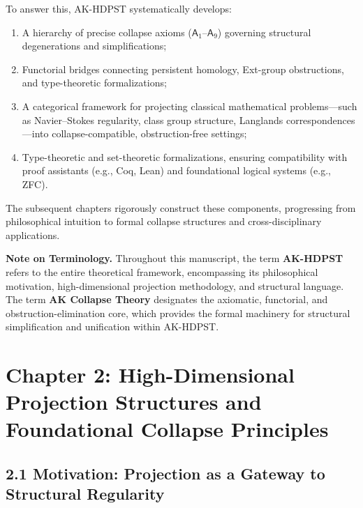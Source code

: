 \documentclass[11pt]{article}
\begin{document}
To answer this, AK-HDPST systematically develops:

\begin{enumerate}
    \item A hierarchy of precise collapse axioms ($\mathsf{A}_1$–$\mathsf{A}_9$) governing structural degenerations and simplifications;
    \item Functorial bridges connecting persistent homology, Ext-group obstructions, and type-theoretic formalizations;
    \item A categorical framework for projecting classical mathematical problems—such as Navier–Stokes regularity, class group structure, Langlands correspondences—into collapse-compatible, obstruction-free settings;
    \item Type-theoretic and set-theoretic formalizations, ensuring compatibility with proof assistants (e.g., Coq, Lean) and foundational logical systems (e.g., ZFC).
\end{enumerate}

The subsequent chapters rigorously construct these components, progressing from philosophical intuition to formal collapse structures and cross-disciplinary applications.

\vspace{1em}
\noindent\textbf{Note on Terminology.}  
Throughout this manuscript, the term \textbf{AK-HDPST} refers to the entire theoretical framework, encompassing its philosophical motivation, high-dimensional projection methodology, and structural language.  
The term \textbf{AK Collapse Theory} designates the axiomatic, functorial, and obstruction-elimination core, which provides the formal machinery for structural simplification and unification within AK-HDPST.



\section{Chapter 2: High-Dimensional Projection Structures and Foundational Collapse Principles}

\subsection*{2.1 Motivation: Projection as a Gateway to Structural Regularity}
\end{document}
